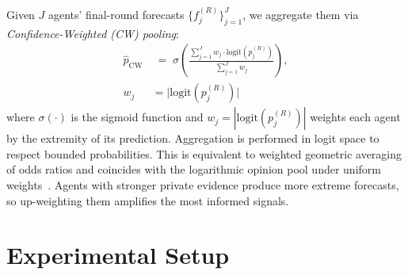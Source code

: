 \documentclass[11pt]{article}
\theoremstyle{plain}
\theoremstyle{definition}
\begin{document}
  Given $J$ agents' final-round forecasts $\{f_j^{(R)}\}_{j=1}^{J}$, we aggregate them via \textit{Confidence-Weighted (CW) pooling}:
  \begin{align}
    \hat{p}_{\mathrm{CW}} &\;=\; \sigma\!\left(
      \frac{\displaystyle\sum_{j=1}^{J} w_j \cdot \mathrm{logit}(p_j^{(R)})}
           {\displaystyle\sum_{j=1}^{J} w_j}
    \right), \nonumber\\
    w_j &= \bigl|\mathrm{logit}(p_j^{(R)})\bigr|
    \label{eq:cw}
  \end{align}
  where $\sigma(\cdot)$ is the sigmoid function and $w_j = |\mathrm{logit}(p_j^{(R)})|$ weights each agent by the extremity of its prediction.
Aggregation is performed in logit space to respect bounded probabilities. This is equivalent to weighted geometric averaging of odds ratios and coincides with the logarithmic opinion pool under uniform weights~\citep{10.1214/ss/1177013825}.
Agents with stronger private evidence produce more extreme forecasts, so up-weighting them amplifies the most informed signals.


\vspace{-0.8em}
\section{Experimental Setup}
\label{sec:setup}
\vspace{-0.5em}
\end{document}
